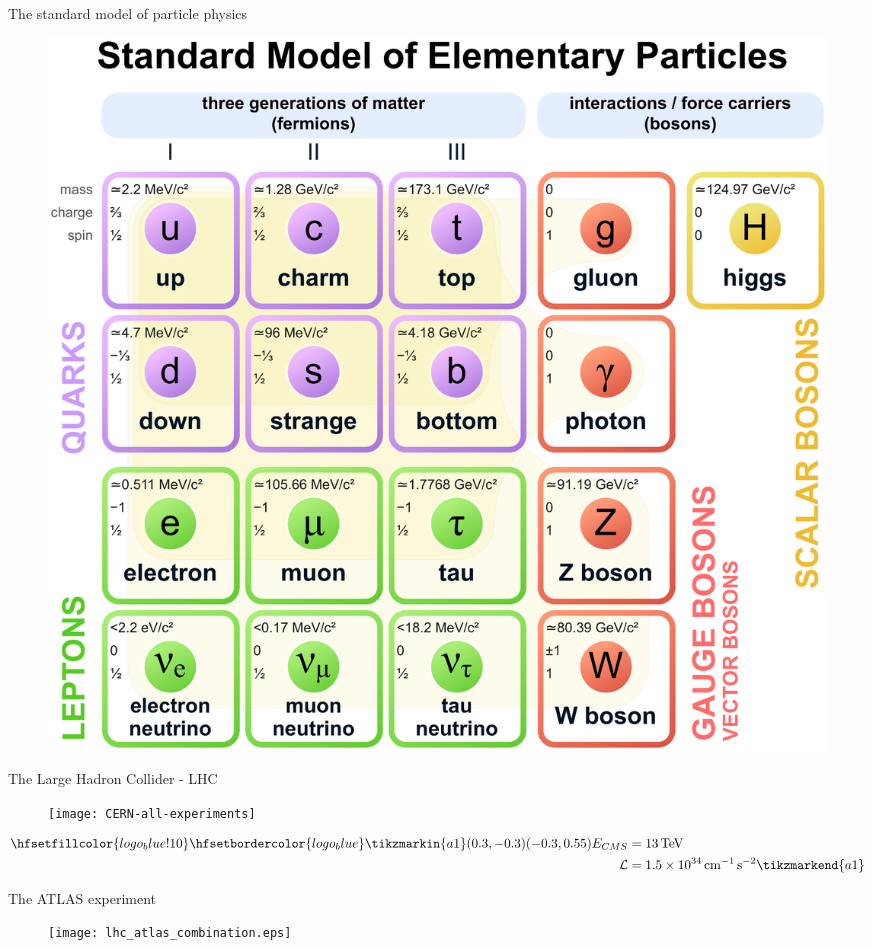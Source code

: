 \begin{frame}{The standard model of particle physics}
\begin{figure}
    \centering
    \includegraphics[scale=0.17]{Standard_Model_of_Elementary_Particles.eps}
    \caption{\cite{standard_model}}
    \label{fig:my_label}
\end{figure}
\end{frame}

\begin{frame}{The Large Hadron Collider - LHC}
    \begin{figure}
        \centering
        \texttt{[image: CERN-all-experiments]}
        \caption{\cite{Pequenao:1095924}}
        \label{fig:my_label}
    \end{figure}
     \begin{align*}
        \hfsetfillcolor{logo_blue!10}
        \hfsetbordercolor{logo_blue}
        \tikzmarkin{a1}(0.3,-0.3)(-0.3,0.55)
        E_{CMS} &= \SI{13}{\tera \electronvolt}\\ 
        \mathcal{L} &= \SI{1.5e34}{\per \centi \metre \square \per \second} 
        \tikzmarkend{a1}
    \end{align*}
\end{frame}

\begin{frame}{The ATLAS experiment}
    \begin{figure}
        \centering
        \texttt{[image: lhc\_atlas\_combination.eps]}
        \caption{\cite{Pequenao:1095924}}
        \label{fig:my_label}
    \end{figure}
\end{frame}


